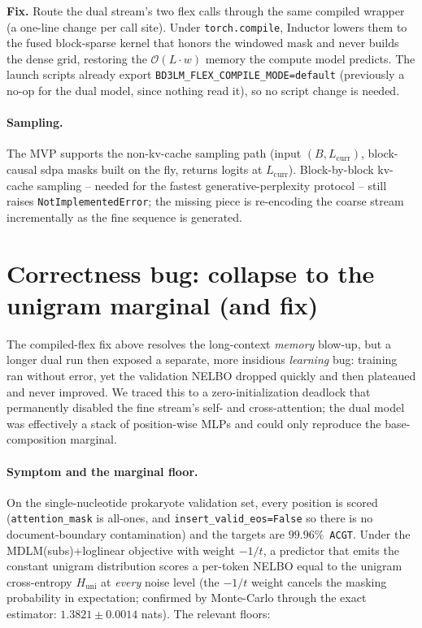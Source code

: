 \documentclass[11pt,a4paper]{article}
\begin{document}
\textbf{Fix.} Route the dual stream's two flex calls through the same compiled
wrapper (a one-line change per call site). Under \texttt{torch.compile},
Inductor lowers them to the fused block-sparse kernel that honors the windowed
mask and never builds the dense grid, restoring the \(\mathcal{O}(L\!\cdot\!w)\)
memory the compute model predicts. The launch scripts already export
\texttt{BD3LM\_FLEX\_COMPILE\_MODE=default} (previously a no-op for the dual
model, since nothing read it), so no script change is needed.

\paragraph{Sampling.} The MVP supports the non-kv-cache sampling path
(input \((B,L_{\text{curr}})\), block-causal sdpa masks built on the fly,
returns logits at \(L_{\text{curr}}\)). Block-by-block kv-cache sampling --
needed for the fastest generative-perplexity protocol -- still raises
\texttt{NotImplementedError}; the missing piece is re-encoding the coarse
stream incrementally as the fine sequence is generated.

\section{Correctness bug: collapse to the unigram marginal (and fix)}
\label{sec:collapse}

The compiled-flex fix above resolves the long-context \emph{memory} blow-up, but
a longer dual run then exposed a separate, more insidious \emph{learning} bug:
training ran without error, yet the validation NELBO dropped quickly and then
plateaued and never improved. We traced this to a zero-initialization deadlock
that permanently disabled the fine stream's self- and cross-attention; the dual
model was effectively a stack of position-wise MLPs and could only reproduce the
base-composition marginal.

\paragraph{Symptom and the marginal floor.}
On the single-nucleotide prokaryote validation set, every position is scored
(\texttt{attention\_mask} is all-ones, and \texttt{insert\_valid\_eos=False} so
there is no document-boundary contamination) and the targets are
\(99.96\%\)~\texttt{ACGT}. Under the MDLM(subs)+loglinear objective with weight
\(-1/t\), a predictor that emits the constant unigram distribution scores a
per-token NELBO equal to the unigram cross-entropy \(H_{\text{uni}}\) at
\emph{every} noise level (the \(-1/t\) weight cancels the masking probability in
expectation; confirmed by Monte-Carlo through the exact estimator:
\(1.3821\pm0.0014\) nats). The relevant floors:
\end{document}
